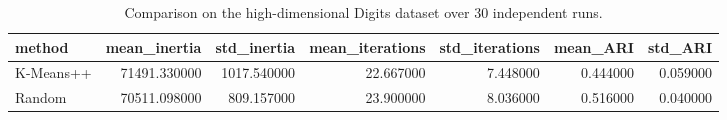 \begin{table}
\caption{Comparison on the high-dimensional Digits dataset over 30 independent runs.}
\label{tab:digits_summary}
\begin{tabular}{lrrrrrr}
\toprule
method & mean_inertia & std_inertia & mean_iterations & std_iterations & mean_ARI & std_ARI \\
\midrule
K-Means++ & 71491.330000 & 1017.540000 & 22.667000 & 7.448000 & 0.444000 & 0.059000 \\
Random & 70511.098000 & 809.157000 & 23.900000 & 8.036000 & 0.516000 & 0.040000 \\
\bottomrule
\end{tabular}
\end{table}
